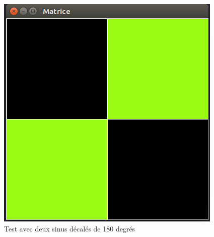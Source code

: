 \begin{figure}[H]
    \centering
    \includegraphics[scale=0.3]{assets/Captures-sinus/PreprocDefautnormal-180.png}
    \caption{Test avec deux sinus décalés de 180 degrés}
    \label{}
\end{figure}
